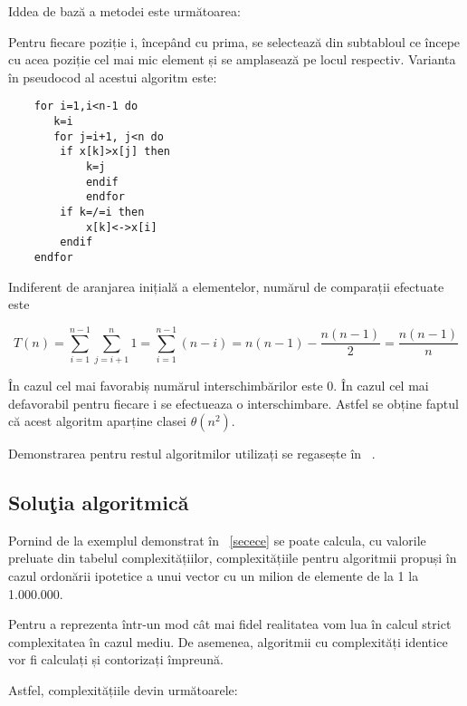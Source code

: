 \documentclass[12pt]{article}
\begin{document}
Iddea de bază a metodei este următoarea:

Pentru fiecare poziție i, începând cu prima, se selectează din subtabloul ce începe cu acea poziție cel mai mic element și se amplasează pe locul respectiv.
Varianta în pseudocod al acestui algoritm este:

\begin{lstlisting}
    for i=1,i<n-1 do
       k=i
       for j=i+1, j<n do
        if x[k]>x[j] then
            k=j
            endif
            endfor
        if k=/=i then
            x[k]<->x[i]
        endif
    endfor
\end{lstlisting}
 Indiferent de aranjarea inițială a elementelor, numărul de comparații efectuate este

\[ T(n)=\sum_{i=1}^{n-1} \sum_{j=i+1}^{n} 1= \sum_{i=1}^{n-1}(n-i)=n(n-1)-\frac{n(n-1)}{2}=\frac{n(n-1)}{n} \]

În cazul cel mai favorabiș numărul interschimbărilor este 0. În cazul cel mai defavorabil pentru fiecare i se efectueaza o interschimbare. Astfel se obține faptul că acest algoritm aparține clasei $\theta(n^2)$.

Demonstrarea pentru restul algoritmilor utilizați se regasește în ~\cite{ZAHARIE2008}.

\subsection{Soluţia algoritmică}

Pornind de la exemplul demonstrat în ~\ref{secece} se poate calcula, cu valorile preluate din tabelul complexitățiilor, complexitățiile pentru algoritmii propuși în cazul ordonării ipotetice a unui vector cu un milion de elemente de la 1 la 1.000.000.

Pentru a reprezenta într-un mod cât mai fidel realitatea vom lua în calcul strict complexitatea în cazul mediu. De asemenea, algoritmii cu complexități identice vor fi calculați și contorizați împreună.

Astfel, complexitățiile devin următoarele:
\end{document}
